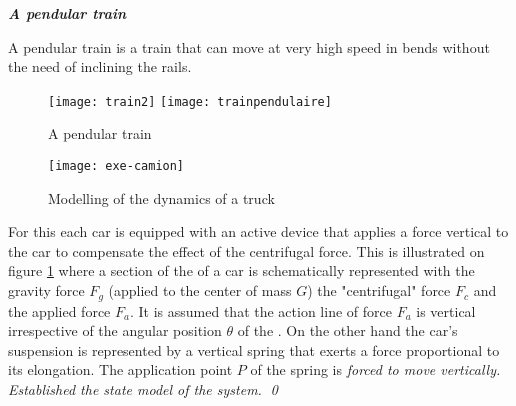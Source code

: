 \begin{exercice}{\bf \em A pendular train}

A pendular train is a train that can move at very high speed in bends without the need of inclining the rails.
\begin{figure}[ht]
\begin{center}
\texttt{[image: train2]}
\texttt{[image: trainpendulaire]}
\caption{A pendular train}
\label{Fig:train}
\end{center}
\end{figure}
\begin{figure}[!h]
\begin{center}
\texttt{[image: exe-camion]}
\caption{Modelling of the dynamics of a truck}
\label{Fig:exe-camion}
\end{center}
\end{figure}
For this each car is equipped with an active device that applies a force vertical to the car  to compensate the effect of the \og centrifugal \fg force. This is illustrated on
figure \ref{Fig:train} where a section of the  of a car is schematically represented with  the gravity force $F_g $ (applied to the center of mass $G$) the "centrifugal" force $F_c$ and the applied force $F_a$. It is assumed that the action line of force $F_a$ is vertical irrespective of the angular position $\theta$ of the . On the other hand the car's suspension is represented by a vertical spring that exerts a force proportional to its elongation.  The application point $P$ of the spring is \it{forced to move vertically}. Established the state model of the system. \qed

\end{exercice}
\vv

